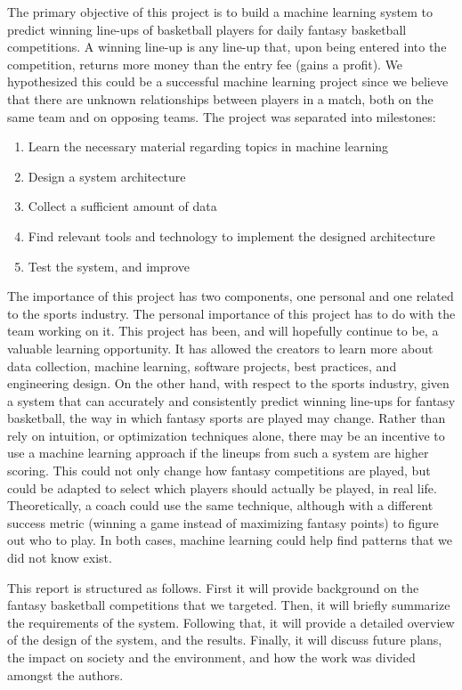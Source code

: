 
The primary objective of this project is to build a machine learning system to predict winning line-ups of basketball players for daily fantasy basketball competitions. A winning line-up is any line-up that, upon being entered into the competition, returns more money than the entry fee (gains a profit). We hypothesized this could be a successful machine learning project since we believe that there are unknown relationships between players in a match, both on the same team and on opposing teams. The project was separated into milestones:
\begin{enumerate}
\item{Learn the necessary material regarding topics in machine learning}
\item{Design a system architecture}
\item{Collect a sufficient amount of data}
\item{Find relevant tools and technology to implement the designed architecture}
\item{Test the system, and improve}
\end{enumerate}
The importance of this project has two components, one personal and one related to the sports industry. The personal importance of this project has to do with the team working on it. This project has been, and will hopefully continue to be, a valuable learning opportunity. It has allowed the creators to learn more about data collection, machine learning, software projects, best practices, and engineering design. On the other hand, with respect to the sports industry, given a system that can accurately and consistently predict winning line-ups for fantasy basketball, the way in which fantasy sports are played may change. Rather than rely on intuition, or optimization techniques alone, there may be an incentive to use a machine learning approach if the lineups from such a system are higher scoring. This could not only change how fantasy competitions are played, but could be adapted to select which players should actually be played, in real life. Theoretically, a coach could use the same technique, although with a different success metric (winning a game instead of maximizing fantasy points) to figure out who to play. In both cases, machine learning could help find patterns that we did not know exist.

This report is structured as follows. First it will provide background on the fantasy basketball competitions that we targeted. Then, it will briefly summarize the requirements of the system. Following that, it will provide a detailed overview of the design of the system, and the results. Finally, it will discuss future plans, the impact on society and the environment, and how the work was divided amongst the authors.